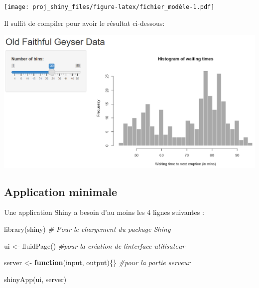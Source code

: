 \documentclass[
]{article}
\newenvironment{Shaded}{\begin{snugshade}}{\end{snugshade}}
\newcommand{\CommentTok}[1]{\textcolor[rgb]{0.56,0.35,0.01}{\textit{#1}}}
\newcommand{\ControlFlowTok}[1]{\textcolor[rgb]{0.13,0.29,0.53}{\textbf{#1}}}
\newcommand{\FunctionTok}[1]{\textcolor[rgb]{0.00,0.00,0.00}{#1}}
\newcommand{\NormalTok}[1]{#1}
\newcommand{\OtherTok}[1]{\textcolor[rgb]{0.56,0.35,0.01}{#1}}
\begin{document}
\texttt{[image: proj\_shiny\_files/figure-latex/fichier\_modèle-1.pdf]}

Il suffit de compiler pour avoir le résultat ci-dessous:

\includegraphics{images/base_shiny.png}

\hypertarget{application-minimale}{%
\subsection{Application minimale}\label{application-minimale}}

Une application Shiny a besoin d'au moins les 4 lignes suivantes :

\begin{Shaded}
\begin{Highlighting}[]
\FunctionTok{library}\NormalTok{(shiny) }\CommentTok{\# Pour le chargement du package Shiny}

\NormalTok{ui }\OtherTok{\textless{}{-}} \FunctionTok{fluidPage}\NormalTok{() }\CommentTok{\#pour la création de l\textquotesingle{}interface utilisateur}

\NormalTok{server }\OtherTok{\textless{}{-}} \ControlFlowTok{function}\NormalTok{(input, output)\{\} }\CommentTok{\#pour la partie serveur}

\FunctionTok{shinyApp}\NormalTok{(ui, server) }
\end{Highlighting}
\end{Shaded}
\end{document}

